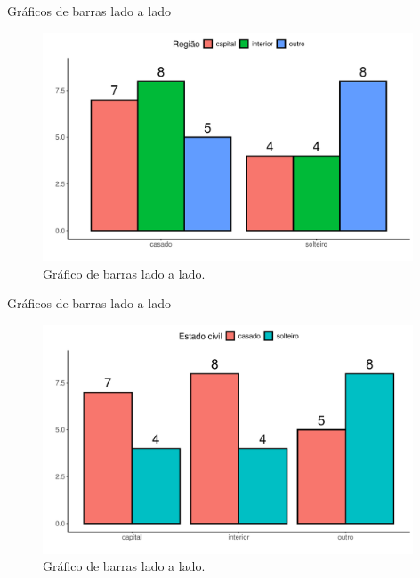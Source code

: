 \documentclass[
  ignorenonframetext,
  serif,
  professionalfont,
  usenames,
  dvipsnames,
  aspectratio = 169]{beamer}
\begin{document}
\begin{frame}{Gráficos de barras lado a lado}
\label{gruxe1ficos-de-barras-lado-a-lado}
\begin{figure}

{\centering \includegraphics[width=11cm]{encontro2_files/figure-beamer/unnamed-chunk-24-1} 

}

\caption{Gráfico de barras lado a lado.}\label{fig:unnamed-chunk-24}
\end{figure}
\end{frame}

\begin{frame}{Gráficos de barras lado a lado}
\label{gruxe1ficos-de-barras-lado-a-lado-1}
\begin{figure}

{\centering \includegraphics[width=11cm]{encontro2_files/figure-beamer/unnamed-chunk-25-1} 

}

\caption{Gráfico de barras lado a lado.}\label{fig:unnamed-chunk-25}
\end{figure}
\end{frame}
\end{document}
